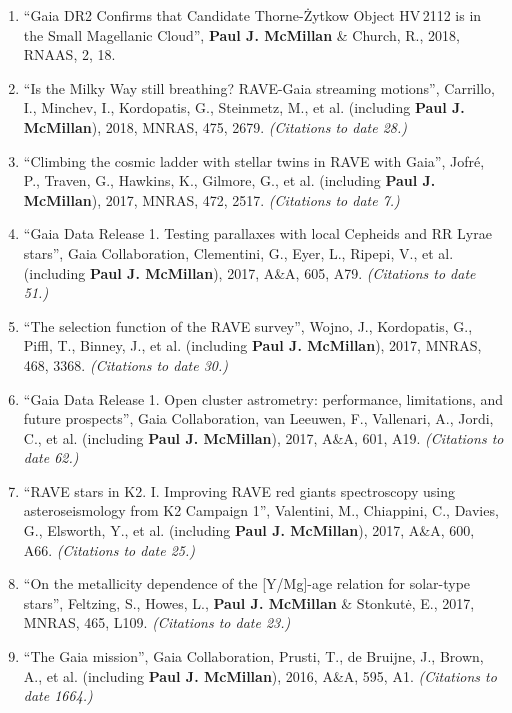 \documentclass{resume}
\begin{document}
\begin{enumerate}
\item ``Gaia DR2 Confirms that Candidate Thorne-\.Zytkow Object HV\,2112 is in the Small Magellanic Cloud'', \textbf{Paul J. McMillan} \& Church, R., 2018, RNAAS, 2, 18.

\item ``Is the Milky Way still breathing? RAVE-Gaia streaming motions'', Carrillo, I., Minchev, I., Kordopatis, G., Steinmetz, M., et al. (including \textbf{Paul J. McMillan}), 2018, MNRAS, 475, 2679. \textit{(Citations to date 28.)}

\item ``Climbing the cosmic ladder with stellar twins in RAVE with Gaia'', Jofr\'e, P., Traven, G., Hawkins, K., Gilmore, G., et al. (including \textbf{Paul J. McMillan}), 2017, MNRAS, 472, 2517. \textit{(Citations to date 7.)}

\item ``Gaia Data Release 1. Testing parallaxes with local Cepheids and RR Lyrae stars'', Gaia Collaboration, Clementini, G., Eyer, L., Ripepi, V., et al. (including \textbf{Paul J. McMillan}), 2017, A\&A, 605, A79. \textit{(Citations to date 51.)}

\item ``The selection function of the RAVE survey'', Wojno, J., Kordopatis, G., Piffl, T., Binney, J., et al. (including \textbf{Paul J. McMillan}), 2017, MNRAS, 468, 3368. \textit{(Citations to date 30.)}

\item ``Gaia Data Release 1. Open cluster astrometry: performance, limitations, and future prospects'', Gaia Collaboration, van Leeuwen, F., Vallenari, A., Jordi, C., et al. (including \textbf{Paul J. McMillan}), 2017, A\&A, 601, A19. \textit{(Citations to date 62.)}

\item ``RAVE stars in K2. I. Improving RAVE red giants spectroscopy using asteroseismology from K2 Campaign 1'', Valentini, M., Chiappini, C., Davies, G., Elsworth, Y., et al. (including \textbf{Paul J. McMillan}), 2017, A\&A, 600, A66. \textit{(Citations to date 25.)}

\item ``On the metallicity dependence of the [Y/Mg]-age relation for solar-type stars'', Feltzing, S., Howes, L., \textbf{Paul J. McMillan} \& Stonkut\.{e}, E., 2017, MNRAS, 465, L109. \textit{(Citations to date 23.)}

\item ``The Gaia mission'', Gaia Collaboration, Prusti, T., de Bruijne, J., Brown, A., et al. (including \textbf{Paul J. McMillan}), 2016, A\&A, 595, A1. \textit{(Citations to date 1664.)}


\end{enumerate}
\end{document}
